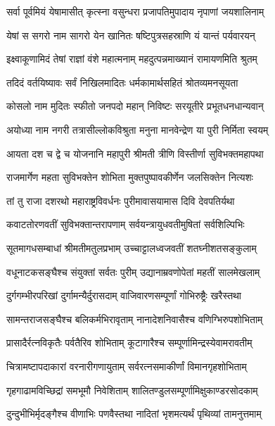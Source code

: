 
\twolineshloka
{सर्वा पूर्वमियं येषामासीत् कृत्स्ना वसुन्धरा}
{प्रजापतिमुपादाय नृपाणां जयशालिनाम्} %

\twolineshloka
{येषां स सगरो नाम सागरो येन खानितः}
{षष्टिपुत्रसहस्राणि यं यान्तं पर्यवारयन्} %

\twolineshloka
{इक्ष्वाकूणामिदं तेषां राज्ञां वंशे महात्मनाम्}
{महदुत्पन्नमाख्यानं रामायणमिति श्रुतम्} %

\twolineshloka
{तदिदं वर्तयिष्यावः सर्वं निखिलमादितः}
{धर्मकामार्थसहितं श्रोतव्यमनसूयता} %

\twolineshloka
{कोसलो नाम मुदितः स्फीतो जनपदो महान्}
{निविष्टः सरयूतीरे प्रभूतधनधान्यवान्} %

\twolineshloka
{अयोध्या नाम नगरी तत्रासील्लोकविश्रुता}
{मनुना मानवेन्द्रेण या पुरी निर्मिता स्वयम्} %

\twolineshloka
{आयता दश च द्वे च योजनानि महापुरी}
{श्रीमती त्रीणि विस्तीर्णा सुविभक्तमहापथा} %

\twolineshloka
{राजमार्गेण महता सुविभक्तेन शोभिता}
{मुक्तपुष्पावकीर्णेन जलसिक्तेन नित्यशः} %

\twolineshloka
{तां तु राजा दशरथो महाराष्ट्रविवर्धनः}
{पुरीमावासयामास दिवि देवपतिर्यथा} %

\twolineshloka
{कवाटतोरणवतीं सुविभक्तान्तरापणाम्}
{सर्वयन्त्रायुधवतीमुषितां सर्वशिल्पिभिः} %

\twolineshloka
{सूतमागधसम्बाधां श्रीमतीमतुलप्रभाम्}
{उच्चाट्टालध्वजवतीं शतघ्नीशतसङ्कुलाम्} %

\twolineshloka
{वधूनाटकसङ्घैश्च संयुक्तां सर्वतः पुरीम्}
{उद्यानाम्रवणोपेतां महतीं सालमेखलाम्} %

\twolineshloka
{दुर्गगम्भीरपरिखां दुर्गामन्यैर्दुरासदाम्}
{वाजिवारणसम्पूर्णां गोभिरुष्ट्रैः खरैस्तथा} %

\twolineshloka
{सामन्तराजसङ्घैश्च बलिकर्मभिरावृताम्}
{नानादेशनिवासैश्च वणिग्भिरुपशोभिताम्} %

\twolineshloka
{प्रासादैर्रत्नविकृतैः पर्वतैरिव शोभिताम्}
{कूटागारैश्च सम्पूर्णामिन्द्रस्येवामरावतीम्} %

\twolineshloka
{चित्रामष्टापदाकारां वरनारीगणायुताम्}
{सर्वरत्नसमाकीर्णां विमानगृहशोभिताम्} %

\twolineshloka
{गृहगाढामविच्छिद्रां समभूमौ निवेशिताम्}
{शालितण्डुलसम्पूर्णामिक्षुकाण्डरसोदकाम्} %

\twolineshloka
{दुन्दुभीभिर्मृदङ्गैश्च वीणाभिः पणवैस्तथा}
{नादितां भृशमत्यर्थं पृथिव्यां तामनुत्तमाम्} %

